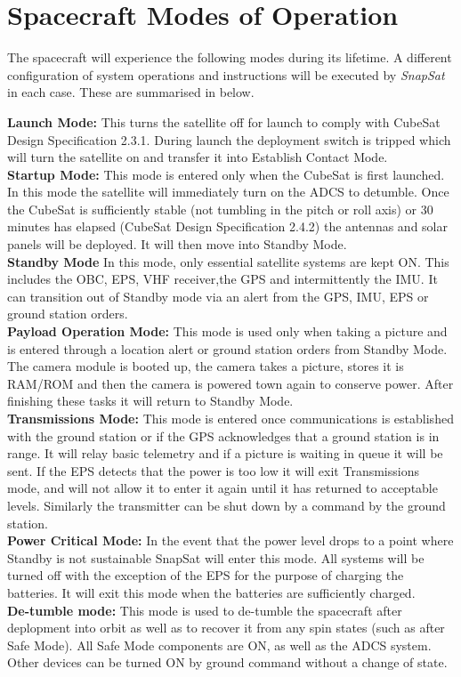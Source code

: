\section{Spacecraft Modes of Operation}
The spacecraft will experience the following modes during its lifetime. A different configuration of system operations and instructions will be executed by \textit{SnapSat} in each case. These are summarised in below.

\noindent
\textbf{Launch Mode: } This turns the satellite off for launch to comply with CubeSat Design Specification 2.3.1. During launch the deployment switch is tripped which will turn the satellite on and transfer it into Establish Contact Mode. \\
\noindent
\textbf{Startup Mode: }This mode is entered only when the CubeSat is first launched.  In this mode the satellite will immediately turn on the ADCS to detumble.  Once the CubeSat is sufficiently stable (not tumbling in the pitch or roll axis) or 30 minutes has elapsed (CubeSat Design Specification 2.4.2) the antennas and solar panels will be deployed. It will then move into Standby Mode. \\
\noindent
\textbf{Standby Mode }In this mode, only essential satellite systems are kept ON.  This includes the OBC, EPS, VHF receiver,the GPS and intermittently the IMU.  It can transition out of Standby mode via an alert from the GPS, IMU, EPS or ground station orders.  \\
\noindent
\textbf{Payload Operation Mode: } This mode is used only when taking a picture and is entered through a location alert or ground station orders from Standby Mode.  The camera module is booted up, the camera takes a picture, stores it is RAM/ROM and then the camera is powered town again to conserve power.  After finishing these tasks it will return to Standby Mode. \\
\noindent
\textbf{Transmissions Mode: } This mode is entered once communications is established with the ground station or if the GPS acknowledges that a ground station is in range.  It will relay basic telemetry and if a picture is waiting in queue it will be sent.  If the EPS detects that the power is too low it will exit Transmissions mode, and will not allow it to enter it again until it has returned to acceptable levels.  Similarly the transmitter can be shut down by a command by the ground station.\\
\noindent
\textbf{Power Critical Mode: } In the event that the power level drops to a point where Standby is not sustainable SnapSat will enter this mode.  All systems will be turned off with the exception of the EPS for the purpose of charging the batteries.  It will exit this mode when the batteries are sufficiently charged. \\
\noindent
\textbf{De-tumble mode: } This mode is used to de-tumble the spacecraft after deplopment into orbit as well as to recover it from any spin states (such as after Safe Mode). All Safe Mode components are ON, as well as the ADCS system. Other devices can be turned ON by ground command without a change of state. \\

